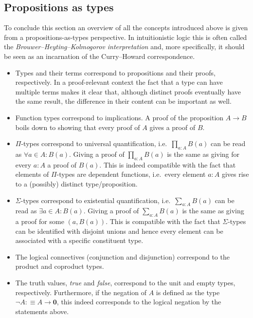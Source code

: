 \subsection{Propositions as types}

    To conclude this section an overview of all the concepts introduced above is given from a propositions-as-types perspective. In intuitionistic logic this is often called the \textit{Brouwer--Heyting--Kolmogorov interpretation} and, more specifically, it should be seen as an incarnation of the Curry--Howard correspondence.

    \begin{itemize}
        \item Types and their terms correspond to propositions and their proofs, respectively. In a proof-relevant context the fact that a type can have multiple terms makes it clear that, although distinct proofs eventually have the same result, the difference in their content can be important as well.
        \item Function types correspond to implications. A proof of the proposition $A\rightarrow B$ boils down to showing that every proof of $A$ gives a proof of $B$.
        \item $\Pi$-types correspond to universal quantification, i.e.~$\prod_{a:A}B(a)$ can be read as $\forall a\in A: B(a)$. Giving a proof of $\prod_{a:A}B(a)$ is the same as giving for every $a:A$ a proof of $B(a)$. This is indeed compatible with the fact that elements of $\Pi$-types are dependent functions, i.e.~every element $a:A$ gives rise to a (possibly) distinct type/proposition.
        \item $\Sigma$-types correspond to existential quantification, i.e.~$\sum_{a:A}B(a)$ can be read as $\exists a\in A:B(a)$. Giving a proof of $\sum_{a:A}B(a)$ is the same as giving a proof for some $(a, B(a))$. This is compatible with the fact that $\Sigma$-types can be identified with disjoint unions and hence every element can be associated with a specific constituent type.
        \item The logical connectives (conjunction and disjunction) correspond to the product and coproduct types.
        \item The truth values, \textit{true} and \textit{false}, correspond to the unit and empty types, respectively. Furthermore, if the negation of $A$ is defined as the type $\lnot A:\equiv A\rightarrow\mathbf{0}$, this indeed corresponds to the logical negation by the statements above.
    \end{itemize}

